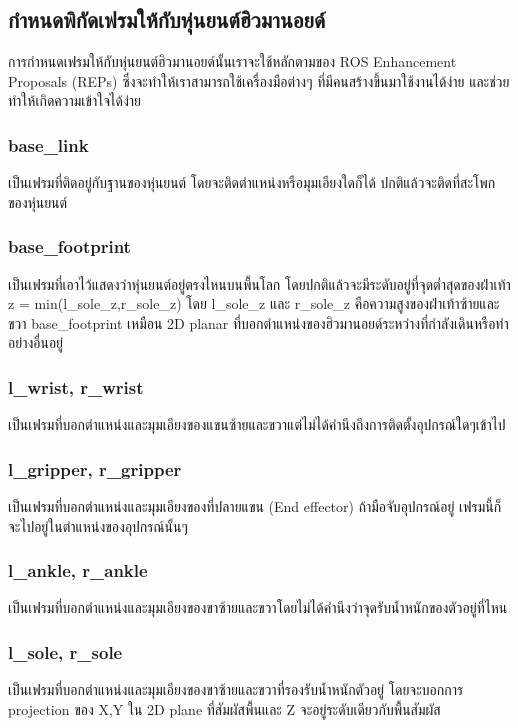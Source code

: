 \clearpage
\subsection{กำหนดพิกัดเฟรมให้กับหุ่นยนต์ฮิวมานอยด์}
การกำหนดเฟรมให้กับหุ่นยนต์ฮิวมานอยด์นั้นเราจะใช้หลักตามของ ROS Enhancement Proposals (REPs) ซึ่งจะทำให้เราสามารถใช้เครื่องมือต่างๆ ที่มีคนสร้างขึ้นมาใช้งานได้ง่าย และช่วยทำให้เกิดความเข้าใจได้ง่าย

\subsubsection*{base\_link}
เป็นเฟรมที่ติดอยู่กับฐานของหุ่นยนต์ โดยจะติดตำแหน่งหรือมุมเอียงใดก็ได้ ปกติแล้วจะติดที่สะโพกของหุ่นยนต์

\subsubsection*{base\_footprint}
เป็นเฟรมที่เอาไว้แสดงว่าหุ่นยนต์อยู่ตรงไหนบนพื้นโลก โดยปกติแล้วจะมีระดับอยู่ที่จุดต่ำสุดของฝ่าเท้า z = min(l\_sole\_z,r\_sole\_z)
โดย l\_sole\_z และ r\_sole\_z คือความสูงของฝ่าเท้าซ้ายและขวา base\_footprint เหมือน 2D planar
ที่บอกตำแหน่งของฮิวมานอยด์ระหว่างที่กำลังเดินหรือทำอย่างอื่นอยู่

\subsubsection*{l\_wrist, r\_wrist}
เป็นเฟรมที่บอกตำแหน่งและมุมเอียงของแขนซ้ายและขวาแต่ไม่ได้คำนึงถึงการติดตั้งอุปกรณ์ใดๆเข้าไป

\subsubsection*{l\_gripper, r\_gripper}
เป็นเฟรมที่บอกตำแหน่งและมุมเอียงของที่ปลายแขน (End effector) ถ้ามือจับอุปกรณ์อยู่ เฟรมนี้ก็จะไปอยู่ในตำแหน่งของอุปกรณ์นั้นๆ

\subsubsection*{l\_ankle, r\_ankle}
เป็นเฟรมที่บอกตำแหน่งและมุมเอียงของขาซ้ายและขวาโดยไม่ได้คำนึงว่าจุดรับน้ำหนักของตัวอยู่ที่ไหน

\subsubsection*{l\_sole, r\_sole}
เป็นเฟรมที่บอกตำแหน่งและมุมเอียงของขาซ้ายและขวาที่รองรับน้ำหนักตัวอยู่ โดยจะบอกการ projection ของ X,Y ใน 2D plane ที่สัมผัสพื้นและ Z จะอยู่ระดับเดียวกับพื้นสัมผัส

